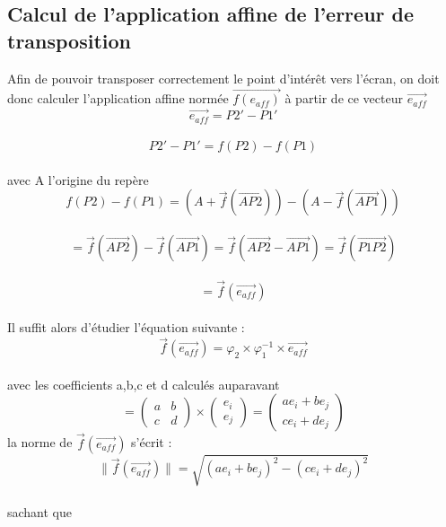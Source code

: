 \documentclass[a4paper, 12pt]{report}
\begin{document}
		\subsection{Calcul de l'application affine de l'erreur de transposition}
Afin de pouvoir transposer correctement le point d'intérêt vers l'écran, on doit donc calculer l'application affine normée  $\overrightarrow{f(e_{aff})}$ à partir de ce vecteur $\overrightarrow{e_{aff}}$\\
$$\overrightarrow{e_{aff}} = P2' - P1'$$\\
$$P2'- P1' = f(P2) - f(P1)$$ \\
avec A l'origine du repère \\
$$f(P2) - f(P1) = (A + \overrightarrow{f}(\overrightarrow{AP2})) - (A - \overrightarrow{f}(\overrightarrow{AP1}))$$ \\
$$ = \overrightarrow{f}(\overrightarrow{AP2}) - \overrightarrow{f}(\overrightarrow{AP1}) = 
\overrightarrow{f}(\overrightarrow{AP2} - \overrightarrow{AP1}) = \overrightarrow{f}(\overrightarrow{P1P2})$$ \\
$$= \overrightarrow{f}(\overrightarrow{e_{aff}})$$ \\
Il suffit alors d'étudier l'équation suivante : \\
$$ \overrightarrow{f}(\overrightarrow{e_{aff}}) = \varphi _{2} \times \varphi _{1}^{-1} \times \overrightarrow{e_{aff}}$$ \\
avec les coefficients a,b,c et d calculés auparavant \\
$$ =
		\left(
		\begin{array}{cc}
		a & b \\
		c & d 
		\end{array}
		\right)
		\times
		\left(\begin{array}{c}
		e_{i} \\
		e_{j}
		\end{array}
		\right) =
		\left( 
		\begin{array}{c}
		ae_{i} + be_{j} \\
		ce_{i} + de_{j}
		\end{array}
		\right)
		$$
la norme de $\overrightarrow{f}(\overrightarrow{e_{aff}})$ s'écrit : \\
$$ \parallel \overrightarrow{f}(\overrightarrow{e_{aff}}) \parallel = \sqrt{(ae_{i} + be_{j})^{2}-(ce_{i} + de_{j})^{2}}$$ \\
sachant que \\
\end{document}
